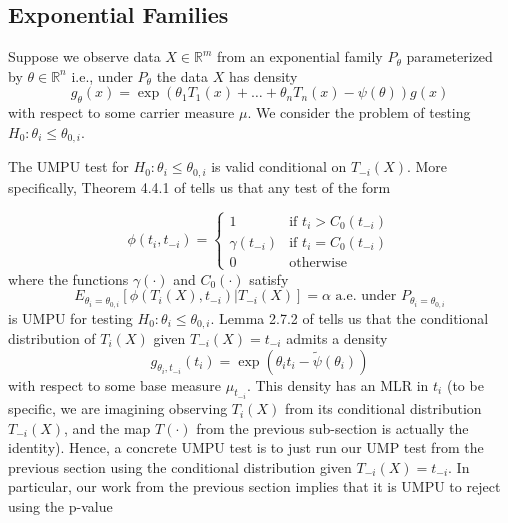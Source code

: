\documentclass{article}
\newcommand{\R}{\mathbb{R}}
\begin{document}
\begin{appendix}
\subsection{Exponential Families}
\label{sec:one_sided_exp_fam_appdx}

Suppose we observe data $X \in \R^m$ from an exponential family $P_{\theta}$ parameterized by $\theta \in \R^n$ i.e., under $P_{\theta}$ the data $X$ has density  
\begin{equation*}
    g_{\theta}(x) = \exp( \theta_1 T_1(x) + \dots + \theta_n T_n(x) - \psi(\theta) ) g(x) 
\end{equation*}
with respect to some carrier measure $\mu$. We consider the problem of testing $H_0: \theta_i \leq \theta_{0, i}$.

The UMPU test for $H_0: \theta_i \leq \theta_{0, i}$ is valid conditional on $T_{-i}(X)$. More specifically, Theorem 4.4.1 of \cite{Lehmann} tells us that any test of the form 

\begin{equation*}
    \label{eq:exp_fam_test}
    \phi(t_i, t_{-i}) = \begin{cases}
        1 &\text{if } t_i > C_0(t_{-i})  \\
        \gamma(t_{-i}) &\text{if } t_i = C_0(t_{-i})   \\
        0 & \text{otherwise }
    \end{cases}
\end{equation*}
where the functions $\gamma(\cdot)$ and $C_0(\cdot)$ satisfy 
\begin{equation*}
    E_{\theta_i = \theta_{0, i}}[\phi(T_i(X), t_{-i}) | T_{-i}(X)] = \alpha \text{ a.e. under } P_{\theta_i = \theta_{0, i}}
\end{equation*}
is UMPU for testing $H_0: \theta_i \leq \theta_{0, i}$. Lemma 2.7.2 of \cite{Lehmann} tells us that the conditional distribution of $T_{i}(X)$ given $T_{-i}(X) = t_{-i}$ admits a density 
\begin{equation*}
    g_{\theta_i, t_{-i}}(t_i) = \exp(\theta_i t_i - \tilde{\psi}(\theta_i))  
\end{equation*}
with respect to some base measure $\mu_{t_{-i}}$. This density has an MLR in $t_i$ (to be specific, we are imagining observing $T_i(X)$ from its conditional distribution $T_{-i}(X)$, and the map $T(\cdot)$ from the previous sub-section is actually the identity). Hence, a concrete UMPU test is to just run our UMP test from the previous section using the conditional distribution given $T_{-i}(X) = t_{-i}$. In particular, our work from the previous section implies that it is UMPU to reject using the p-value


\end{appendix}
\end{document}
